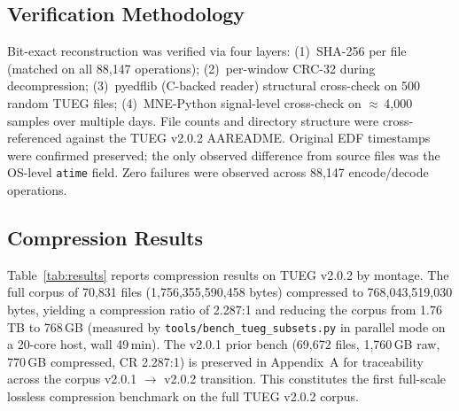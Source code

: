 \documentclass[journal]{IEEEtran}
\begin{document}
\subsection{Verification Methodology}
Bit-exact reconstruction was verified via four layers:
(1)~SHA-256 per file (matched on all 88{,}147 operations);
(2)~per-window CRC-32 during decompression;
(3)~pyedflib (C-backed reader) structural cross-check on 500
random TUEG files; (4)~MNE-Python signal-level cross-check on
$\approx$\,4{,}000 samples over multiple days. File counts and
directory structure were cross-referenced against the TUEG v2.0.2
AAREADME. Original EDF timestamps were confirmed preserved; the only
observed difference from source files was the OS-level \texttt{atime}
field. Zero failures were observed across 88{,}147 encode/decode
operations.

\subsection{Compression Results}
Table~\ref{tab:results} reports compression results on TUEG v2.0.2
by montage. The full corpus of 70{,}831 files
(1{,}756{,}355{,}590{,}458 bytes) compressed to
768{,}043{,}519{,}030 bytes, yielding a compression ratio of
2.287:1 and reducing the corpus from 1.76\,TB to 768\,GB
(measured by \texttt{tools/bench\_tueg\_subsets.py} in parallel
mode on a 20-core host, wall 49\,min). The v2.0.1 prior bench
(69{,}672 files, 1{,}760\,GB raw, 770\,GB compressed, CR 2.287:1)
is preserved in Appendix~A for traceability across the corpus
v2.0.1 $\rightarrow$ v2.0.2 transition. This constitutes the
first full-scale lossless compression benchmark on the full TUEG
v2.0.2 corpus.
\end{document}
